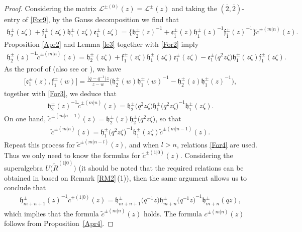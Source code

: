 \documentclass[10pt,a4paper]{amsart}
\numberwithin{equation}{section}
\begin{document}
\begin{proof}
Considering the matrix $ \mathcal{L}^{\pm (0)}(z)=\mathcal{L}^{\pm }(z)$ and taking the $(\overline{2},\overline{2})$-entry of \eqref{For9}, by the Gauss decomposition we find that
\begin{gather*}
 \mathfrak{h}_2^{\pm}(z\zeta)+\mathfrak{f}_1^{\pm}(z\zeta)\mathfrak{h}_1^{\pm}(z\zeta)\mathfrak{e}_1^{\pm}(z\zeta)=
 \bigl\{{\mathfrak{h}_{\overline{2}}^{\pm}(z)}^{-1}+\mathfrak{e}_{\overline{1}}^{\pm}(z){\mathfrak{h}_{\overline{1}}^{\pm}(z)}^{-1}
 {\mathfrak{f}_{\overline{1}}^{\pm}(z)}^{-1}\bigr\}\widetilde{c}^{\pm(m|n)}(z).
\end{gather*}Proposition \ref{Apr2} and Lemma \ref{le3} together with \eqref{For2} imply
\begin{gather*}
 {\mathfrak{h}_{\overline{2}}^{\pm}(z)}^{-1}\widetilde{c}^{\pm(m|n)}(z)=\mathfrak{h}_2^{\pm}(z\zeta)+\mathfrak{f}_1^{\pm}(z\zeta)\mathfrak{h}_1^{\pm}(z\zeta)
 \mathfrak{e}_1^{\pm}(z\zeta)-\mathfrak{e}_1^{\pm}\bigl(q^{2}z\zeta\bigr)\mathfrak{h}_1^{\pm}(z\zeta)\mathfrak{f}_1^{\pm}(z\zeta).
\end{gather*}
As the proof of \cite{HBKD} (also see \cite{JSKW} or \cite{YZC}), we have
\begin{gather*}
\bigl[\mathfrak{e}_1^{\pm}(z), \mathfrak{f}_1^{\pm}(w)\bigr]=\frac{\bigl(q-q^{-1}\bigr)z}{z-w}\bigl(\mathfrak{h}_2^{\pm}(w){\mathfrak{h}_1^{\pm}(w)}^{-1}-\mathfrak{h}_2^{\pm}(z)
{\mathfrak{h}_1^{\pm}(z)}^{-1}\bigr),
\end{gather*}together with \eqref{For3}, we deduce that
\begin{gather*}
 {\mathfrak{h}_{\overline{2}}^{\pm}(z)}^{-1}\widetilde{c}^{\pm(m|n)}(z)=\mathfrak{h}_2^{\pm}\bigl(q^{2}z\zeta\bigr)
 {\mathfrak{h}_1^{\pm}\bigl(q^{2}z\zeta\bigr)}^{-1}\mathfrak{h}_1^{\pm}(z\zeta).
\end{gather*}
On one hand, $\widetilde{c}^{\pm(m|n-1)}(z)=\mathfrak{h}_{\overline{2}}^{\pm}(z)\mathfrak{h}_2^{\pm}\bigl(q^{2}z\zeta\bigr)$, so that
\begin{gather*}
 \widetilde{c}^{\pm(m|n)}(z)=
 {\mathfrak{h}_1^{\pm}\bigl(q^{2}z\zeta\bigr)}^{-1}\mathfrak{h}_1^{\pm}(z\zeta)\widetilde{c}^{\pm(m|n-1)}(z).
\end{gather*}
Repeat this process for $\widetilde{c}^{\pm(m|n-l)}(z)$, and when $l>n$, relations \eqref{For4} are used. Thus we only need to know the formulas for $\widetilde{c}^{\pm(1|0)}(z)$. Considering the superalgebra
 $U\bigl(\widetilde{R}^{(1|0)}\bigr)$ (it should be noted that the required relations can be obtained in \cite{JMAB} based on Remark \ref{RM2}\,(1)), then the same argument allows us to conclude that
\begin{gather*}
 {\mathfrak{h}_{m+n+1}^{\pm}(z)}^{-1}\widetilde{c}^{\pm(1|0)}(z)=\mathfrak{h}_{m+n+1}^{\pm}\bigl(q^{-1}z\bigr)
 {\mathfrak{h}_{m+n}^{\pm}\bigl(q^{-1}z\bigr)}^{-1}\mathfrak{h}_{m+n}^{\pm}(qz),
\end{gather*}which implies that the formula $\widetilde{c}^{\pm(m|n)}(z)$ holds. The formula $c^{\pm(m|n)}(z)$ follows from Proposition~\ref{Apr4}.
\end{proof}
\end{document}
